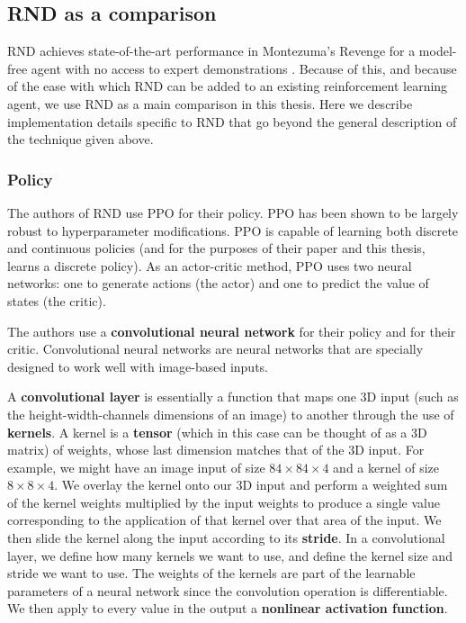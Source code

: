 \documentclass[journal, onecolumn, 12pt, draftclsnofoot]{IEEEtran}
\newcommand{\kword}[1]{\textbf{#1}}
\begin{document}
	\subsection{RND as a comparison}
	\par RND achieves state-of-the-art performance in Montezuma's Revenge for a model-free agent with no access to expert demonstrations \cite{rnd}. Because of this, and because of the ease with which RND can be added to an existing reinforcement learning agent, we use RND as a main comparison in this thesis. Here we describe implementation details specific to RND that go beyond the general description of the technique given above.
	\subsubsection{Policy}
	\par The authors of RND use PPO for their policy. PPO has been shown to be largely robust to hyperparameter modifications. PPO is capable of learning both discrete and continuous policies (and for the purposes of their paper and this thesis,  learns a discrete policy). As an actor-critic method, PPO uses two neural networks: one to generate actions (the actor) and one to predict the value of states (the critic).
	\par The authors use a \kword{convolutional neural network} for their policy and for their critic. Convolutional neural networks are neural networks that are specially designed to work well with image-based inputs.
	\par A \kword{convolutional layer} is essentially a function that maps one 3D input (such as the height-width-channels dimensions of an image) to another through the use of \kword{kernels}. A kernel is a \kword{tensor} (which in this case can be thought of as a 3D matrix) of weights, whose last dimension matches that of the 3D input. For example, we might have an image input of size $84 \times 84 \times 4$ and a kernel of size $8 \times 8 \times 4$. We overlay the kernel onto our 3D input and perform a weighted sum of the kernel weights multiplied by the input weights to produce a single value corresponding to the application of that kernel over that area of the input. We then slide the kernel along the input according to its \kword{stride}. In a convolutional layer, we define how many kernels we want to use, and define the kernel size and stride we want to use. The weights of the kernels are part of the learnable parameters of a neural network since the convolution operation is differentiable. We then apply to every value in the output a \kword{nonlinear activation function}.
\end{document}
